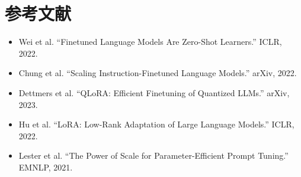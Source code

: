 \documentclass[UTF8,zihao=-4]{ctexart}
\begin{document}
\section*{参考文献}
\begin{itemize}
  \item Wei et al. ``Finetuned Language Models Are Zero-Shot Learners.'' ICLR, 2022.
  \item Chung et al. ``Scaling Instruction-Finetuned Language Models.'' arXiv, 2022.
  \item Dettmers et al. ``QLoRA: Efficient Finetuning of Quantized LLMs.'' arXiv, 2023.
  \item Hu et al. ``LoRA: Low-Rank Adaptation of Large Language Models.'' ICLR, 2022.
  \item Lester et al. ``The Power of Scale for Parameter-Efficient Prompt Tuning.'' EMNLP, 2021.
\end{itemize}
\end{document}
